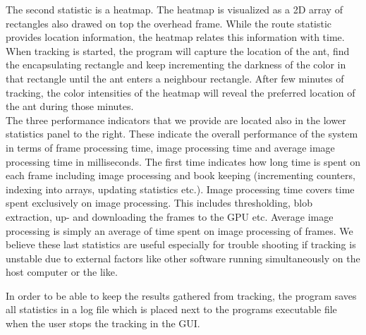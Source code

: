 The second statistic is a heatmap. The heatmap is visualized as a 2D array of rectangles also drawed on top the overhead frame. While the route statistic provides location information, the heatmap relates this information with time. When tracking is started, the program will capture the location of the ant, find the encapsulating rectangle and keep incrementing the darkness of the color in that rectangle until the ant enters a neighbour rectangle. After few minutes of tracking, the color intensities of the heatmap will reveal the preferred location of the ant during those minutes. \\

The three performance indicators that we provide are located also in the lower statistics panel to the right. These indicate the overall performance of the system in terms of frame processing time, image processing time and average image processing time in milliseconds. The first time indicates how long time is spent on each frame including image processing and book keeping (incrementing counters, indexing into arrays, updating statistics etc.). Image processing time covers time spent exclusively on image processing. This includes thresholding, blob extraction, up- and downloading the frames to the GPU etc. Average image processing is simply an average of time spent on image processing of frames. We believe these last statistics are useful especially for trouble shooting if tracking is unstable due to external factors like other software running simultaneously on the host computer or the like.

In order to be able to keep the results gathered from tracking, the program saves all statistics in a log file which is placed next to the programs executable file when the user stops the tracking in the GUI.

